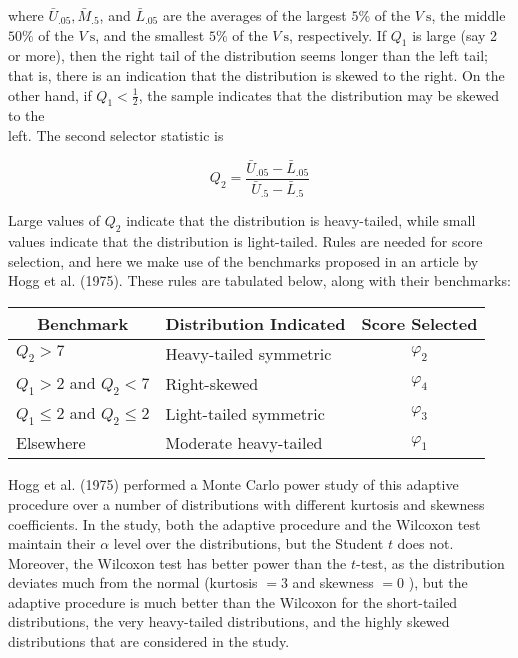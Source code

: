 where $\bar{U}_{.05}, \bar{M}_{.5}$, and $\bar{L}_{.05}$ are the averages of the largest $5 \%$ of the $V \mathrm{~s}$, the middle $50 \%$ of the $V \mathrm{~s}$, and the smallest $5 \%$ of the $V \mathrm{~s}$, respectively. If $Q_{1}$ is large (say 2 or more), then the right tail of the distribution seems longer than the left tail; that is, there is an indication that the distribution is skewed to the right. On the other hand, if $Q_{1}<\frac{1}{2}$, the sample indicates that the distribution may be skewed to the\\
left. The second selector statistic is


\begin{equation*}
Q_{2}=\frac{\bar{U}_{.05}-\bar{L}_{.05}}{\bar{U}_{.5}-\bar{L}_{.5}} \tag{10.6.3}
\end{equation*}


Large values of $Q_{2}$ indicate that the distribution is heavy-tailed, while small values indicate that the distribution is light-tailed. Rules are needed for score selection, and here we make use of the benchmarks proposed in an article by Hogg et al. (1975). These rules are tabulated below, along with their benchmarks:

\begin{center}
\begin{tabular}{|l|l|c|}
\hline
\multicolumn{1}{|c|}{Benchmark} & Distribution Indicated & Score Selected \\
\hline
$Q_{2}>7$ & Heavy-tailed symmetric & $\varphi_{2}$ \\
\hline
$Q_{1}>2$ and $Q_{2}<7$ & Right-skewed & $\varphi_{4}$ \\
\hline
$Q_{1} \leq 2$ and $Q_{2} \leq 2$ & Light-tailed symmetric & $\varphi_{3}$ \\
\hline
Elsewhere & Moderate heavy-tailed & $\varphi_{1}$ \\
\hline
\end{tabular}
\end{center}

Hogg et al. (1975) performed a Monte Carlo power study of this adaptive procedure over a number of distributions with different kurtosis and skewness coefficients. In the study, both the adaptive procedure and the Wilcoxon test maintain their $\alpha$ level over the distributions, but the Student $t$ does not. Moreover, the Wilcoxon test has better power than the $t$-test, as the distribution deviates much from the normal (kurtosis $=3$ and skewness $=0$ ), but the adaptive procedure is much better than the Wilcoxon for the short-tailed distributions, the very heavy-tailed distributions, and the highly skewed distributions that are considered in the study.

